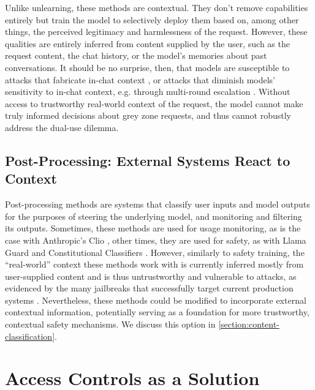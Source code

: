 \documentclass{article}
\theoremstyle{plain}
\theoremstyle{definition}
\theoremstyle{remark}
\begin{document}
Unlike unlearning, these methods are contextual.
They don't remove capabilities entirely but train the model to selectively deploy them based on, among other things, the perceived legitimacy and harmlessness of the request.
However, these qualities are entirely inferred from content supplied by the user, such as the request content, the chat history, or the model's memories about past conversations.
It should be no surprise, then, that models are susceptible to attacks that fabricate in-chat context \cite{zeng2024johnnypersuadellmsjailbreak}, or attacks that diminish models' sensitivity to in-chat context, e.g. through multi-round escalation \cite{russinovich2025greatwritearticlethat}.
Without access to trustworthy real-world context of the request, the model cannot make truly informed decisions about grey zone requests, and thus cannot robustly address the dual-use dilemma.

\subsection{Post-Processing: External Systems React to Context} \label{section:post-processing}

Post-processing methods are systems that classify user inputs and model outputs for the purposes of steering the underlying model, and monitoring and filtering its outputs.
Sometimes, these methods are used for usage monitoring, as is the case with Anthropic's Clio \cite{tamkin2024clioprivacypreservinginsightsrealworld, handa2025economictasksperformedai}, other times, they are used for safety, as with Llama Guard \cite{inan2023llamaguardllmbasedinputoutput} and Constitutional Classifiers \cite{sharma2025constitutionalclassifiersdefendinguniversal}.
However, similarly to safety training, the ``real-world'' context these methods work with is currently inferred mostly from user-supplied content and is thus untrustworthy and vulnerable to attacks, as evidenced by the many jailbreaks that successfully target current production systems \cite{zhang2025outputconstraintsattacksurface}.
Nevertheless, these methods could be modified to incorporate external contextual information, potentially serving as a foundation for more trustworthy, contextual safety mechanisms. We discuss this option in \cref{section:content-classification}.

\section{Access Controls as a Solution}
\label{section:access-controls}
\end{document}

